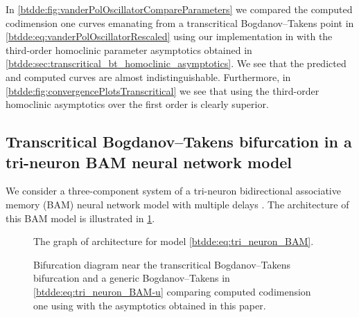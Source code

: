 In \cref{btdde:fig:vanderPolOscillatorCompareParameters} we compared the computed
codimension one curves emanating from a transcritical Bogdanov--Takens point in
\cref{btdde:eq:vanderPolOscillatorRescaled} using our implementation in \DDEBIFTOOL
with the third-order homoclinic parameter asymptotics obtained in
\cref{btdde:sec:transcritical_bt_homoclinic_asymptotics}. We see that the predicted
and computed curves are almost indistinguishable. Furthermore, in
\cref{btdde:fig:convergencePlotsTranscritical} we see that using the third-order
homoclinic asymptotics over the first order is clearly superior.

\subsection{Transcritical Bogdanov--Takens bifurcation in a tri-neuron BAM neural network model}
\label{btdde:sec:Tri-neuron-BAM-neural}

We consider a three-component system of a tri-neuron bidirectional
associative memory (BAM) neural network model with multiple delays \cite{dong2013bogdanov}.
The architecture of this BAM model is illustrated in \cref{btdde:fig:BAM_architecture_graph}. 

\begin{figure}
\centering
{}
\caption{The graph of architecture for model \cref{btdde:eq:tri_neuron_BAM}.}
\label{btdde:fig:BAM_architecture_graph}
\end{figure}

\begin{figure}[ht]
\centering
{}
\caption{
Bifurcation diagram near the transcritical Bogdanov--Takens bifurcation and
a generic Bogdanov--Takens in \cref{btdde:eq:tri_neuron_BAM-u} comparing computed
codimension one using \DDEBIFTOOL with the asymptotics obtained in this
paper.}
\label{btdde:fig:triNeuronBAMNeuralNetworkModelCompareParameters}
\end{figure}

